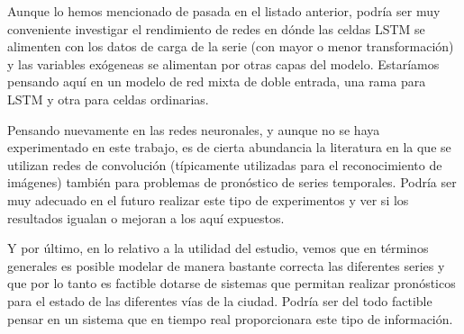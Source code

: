 \documentclass[]{book}
\begin{document}
Aunque lo hemos mencionado de pasada en el listado anterior, podría ser
muy conveniente investigar el rendimiento de redes en dónde las celdas
LSTM se alimenten con los datos de carga de la serie (con mayor o menor
transformación) y las variables exógeneas se alimentan por otras capas
del modelo. Estaríamos pensando aquí en un modelo de red mixta de doble
entrada, una rama para LSTM y otra para celdas ordinarias.

Pensando nuevamente en las redes neuronales, y aunque no se haya
experimentado en este trabajo, es de cierta abundancia la literatura en
la que se utilizan redes de convolución (típicamente utilizadas para el
reconocimiento de imágenes) también para problemas de pronóstico de
series temporales. Podría ser muy adecuado en el futuro realizar este
tipo de experimentos y ver si los resultados igualan o mejoran a los
aquí expuestos.

Y por último, en lo relativo a la utilidad del estudio, vemos que en
términos generales es posible modelar de manera bastante correcta las
diferentes series y que por lo tanto es factible dotarse de sistemas que
permitan realizar pronósticos para el estado de las diferentes vías de
la ciudad. Podría ser del todo factible pensar en un sistema que en
tiempo real proporcionara este tipo de información.




\end{document}
